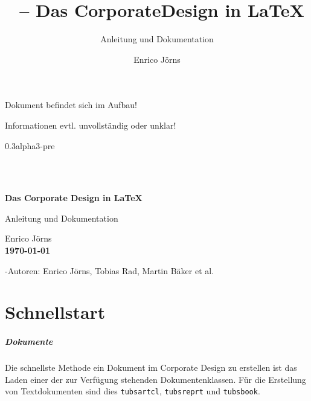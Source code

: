 \documentclass[a4paper,11pt,twoside=false,rgb,extramargin]{tubsbook}
\title{\tubslatex\ -- Das CorporateDesign in \LaTeX}
\subtitle{Anleitung und Dokumentation}
\author{Enrico Jörns}
\begin{document}



\pagestyle{empty}
\hfill
\begin{center}
\huge\color{tuRed}
Dokument befindet sich im Aufbau!\bigskip

Informationen evtl. unvollständig oder unklar!
\end{center}
\vspace*{3cm}
\begin{center}
\LARGE\tubslatex 0.3alpha3-pre
\end{center}

\newpage~\newpage

\begin{titlepage}
  \showtubslogo
  \showtopline
  \begin{segment}{2}
    \centering
    \Huge \tubslatex\\[\medskipamount]
    \bfseries\huge Das Corporate Design in \LaTeX
  \end{segment}
  \begin{segment}{1}
    \centering
    \LARGE Anleitung und Dokumentation
  \end{segment}
  \begin{segment}{2}
    \centering
    \Large Enrico Jörns\\[\bigskipamount]
    \bfseries\today
  \end{segment}
  \begin{segment}{3}
    \Large \tubslatex-Autoren: Enrico Jörns, Tobias Rad, Martin Bäker et al.
  \end{segment}
\end{titlepage}



\pagestyle{scrheadings}
\tableofcontents


\newcommand{\newdocumentclass}[1]{\textcolor{tuRed}{\lstinline{#1}}}
\newcommand{\newpackage}[1]{\textcolor{tuRed}{\lstinline{#1}}}



\chapter{Schnellstart}\label{chap:rapid}


\paragraph{Dokumente}
Die schnellste Methode ein Dokument im Corporate Design zu erstellen ist
das Laden einer der zur Verfügung stehenden Dokumentenklassen.
Für die Erstellung von Textdokumenten sind dies \newdocumentclass{tubsartcl},
\newdocumentclass{tubsreprt} und \newdocumentclass{tubsbook}.
\end{document}
